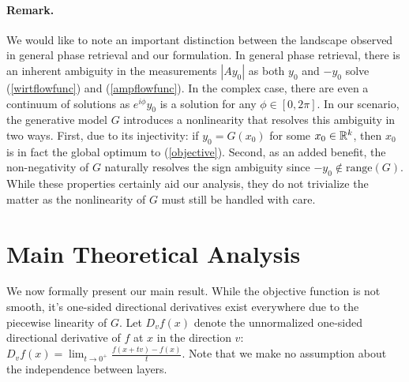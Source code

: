 \documentclass{article}
\begin{document}
\paragraph{Remark.} We would like to note an important distinction between the landscape observed in general phase retrieval and our formulation. In general phase retrieval, there is an inherent ambiguity in the measurements $|Ay_0|$ as both $y_0$ and $-y_0$ solve (\ref{wirtflowfunc}) and (\ref{ampflowfunc}). In the complex case, there are even a continuum of solutions as $e^{i\phi}y_0$ is a solution for any $\phi \in [0,2\pi]$. In our scenario, the generative model $G$ introduces a nonlinearity that resolves this ambiguity in two ways. First, due to its injectivity: if $y_0 = G(x_0)$ for some $x_0 \in \mathbb{R}^k$, then $x_0$ is in fact the global optimum to (\ref{objective}). Second, as an added benefit, the non-negativity of $G$ naturally resolves the sign ambiguity since $-y_0 \notin \text{range}(G)$. While these properties certainly aid our analysis, they do not trivialize the matter as the nonlinearity of $G$ must still be handled with care. 






\section{Main Theoretical Analysis}

We now formally present our main result. While the objective function is not smooth, it's one-sided directional derivatives exist everywhere due to the piecewise linearity of $G$. Let $D_vf(x)$ denote the unnormalized one-sided directional derivative of $f$ at $x$ in the direction $v$: $D_v f(x) = \lim_{t \rightarrow 0^+} \frac{f(x + tv) - f(x)}{t}.$ Note that we make no assumption about the independence between layers.
\end{document}

